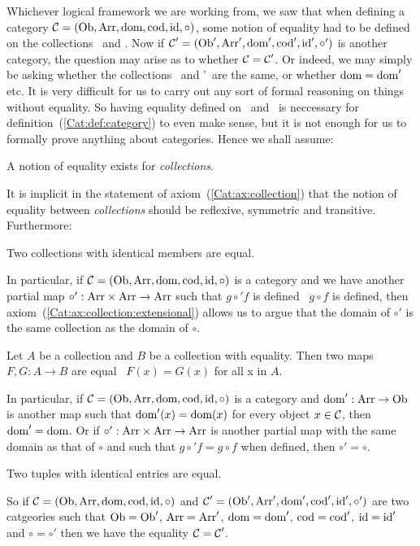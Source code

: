 Whichever logical framework we are working from, we saw that when defining
a category $\mbox{$\cal C$}=(\mbox{\rm Ob}, \mbox{\rm Arr}, \mbox{\rm dom}, \mbox{\rm cod}, \mbox{\rm id}, \circ)$, some notion of
equality had to be defined on the collections \ob\ and \arr. Now if
$\mbox{$\cal C$}'=(\mbox{\rm Ob}', \mbox{\rm Arr}', \mbox{\rm dom}', \mbox{\rm cod}', \mbox{\rm id}', \circ')$ is another category,
the question may arise as to whether $\mbox{$\cal C$}=\mbox{$\cal C$}'$. Or indeed, we may 
simply be asking whether the collections \ob\ and \ob'\ are the same,
or whether $\mbox{\rm dom}=\mbox{\rm dom}'$ etc. It is very difficult for us to carry out
any sort of formal reasoning on things without equality. So having
equality defined on \ob\ and \arr\ is neccessary for
definition~(\ref{Cat:def:category}) to even make sense, but it is not
enough for us to formally prove anything about categories. Hence we shall
assume:

\begin{axiom}\label{Cat:ax:collection}
    A notion of equality exists for {\em collections}.
\end{axiom}

\noindent
It is implicit in the statement of axiom~(\ref{Cat:ax:collection})
that the notion of equality between {\em collections} should 
be reflexive, symmetric and transitive. Furthermore:

\begin{axiom}\label{Cat:ax:collection:extensional}
    Two collections with identical members are equal.
\end{axiom}
In particular, if $\mbox{$\cal C$}=(\mbox{\rm Ob}, \mbox{\rm Arr}, \mbox{\rm dom}, \mbox{\rm cod}, \mbox{\rm id}, \circ)$ is
a category and we have another partial map $\circ':\mbox{\rm Arr}\times\mbox{\rm Arr}\to\mbox{\rm Arr}$ 
such that $g\circ' f$ is defined \ifand\ $g\circ f$ is defined,
then axiom~(\ref{Cat:ax:collection:extensional}) allows us to argue 
that the domain of $\circ'$ is the same collection as the domain
of $\circ$.

\begin{axiom}\label{Cat:ax:map:extensional}
    Let $A$ be a collection and $B$ be a collection with equality.
    Then two maps $F,G:A\to B$ are equal \ifand\ $F(x)=G(x)$ for all x in $A$.
\end{axiom}
In particular, if $\mbox{$\cal C$}=(\mbox{\rm Ob}, \mbox{\rm Arr}, \mbox{\rm dom}, \mbox{\rm cod}, \mbox{\rm id}, \circ)$ is a 
category and $\mbox{\rm dom}':\mbox{\rm Arr}\to\mbox{\rm Ob}$ is another map such that $\mbox{\rm dom}'(x)=\mbox{\rm dom}(x)$
for every object $x\in\mbox{$\cal C$}$, then $\mbox{\rm dom}'=\mbox{\rm dom}$. Or if $\circ':\mbox{\rm Arr}\times\mbox{\rm Arr}\to\mbox{\rm Arr}$ 
is another partial map  with the same domain as that of $\circ$ and such that 
$g\circ' f = g\circ f$ when defined, then $\circ'=\circ$.

\begin{axiom}\label{Cat:ax:tuple:extensional}
    Two tuples with identical entries are equal.
\end{axiom}
So if $\mbox{$\cal C$}=(\mbox{\rm Ob}, \mbox{\rm Arr}, \mbox{\rm dom}, \mbox{\rm cod}, \mbox{\rm id}, \circ)$ and
$\mbox{$\cal C$}'=(\mbox{\rm Ob}', \mbox{\rm Arr}', \mbox{\rm dom}', \mbox{\rm cod}', \mbox{\rm id}', \circ')$ are two catgeories
such that $\mbox{\rm Ob}=\mbox{\rm Ob}'$, $\mbox{\rm Arr}=\mbox{\rm Arr}'$, $\mbox{\rm dom}=\mbox{\rm dom}'$, $\mbox{\rm cod}=\mbox{\rm cod}'$,
$\mbox{\rm id}=\mbox{\rm id}'$ and $\circ=\circ'$ then we have the equality $\mbox{$\cal C$}=\mbox{$\cal C$}'$.
\newpage
